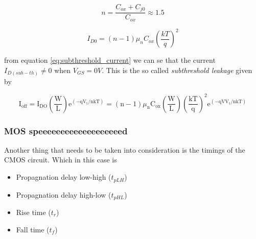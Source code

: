 \begin{equation}
    n=\frac{C_{ox}+C_{j0}}{C_{ox}}\approx 1.5
    \label{eq:n}
\end{equation}

\begin{equation}
    I_{D0}=(n-1)\mu_nC_{ox}\left(\frac{kT}{q}\right)^2
\end{equation}

from equation \ref{eq:subthreshold_current} we can se that the current $I_{D(sub-th)}\neq 0$ when $V_{GS}=0V$. This is the so called \textit{subthreshold leakage} given by 

\begin{equation}
    \mathrm{I}_{\mathrm{off}}=\mathrm{I}_{\mathrm{DO}}\left(\frac{\mathrm{W}}{\mathrm{L}}\right) \mathrm{e}^{\left(-\mathrm{q} \mathrm{V}_{\mathrm{t}} / \mathrm{nkT}\right)}=(\mathrm{n}-1) \mu_{\mathrm{n}} \mathrm{C}_{\mathrm{ox}}\left(\frac{\mathrm{W}}{\mathrm{L}}\right)\left(\frac{\mathrm{kT}}{\mathrm{q}}\right)^2 \mathrm{e}^{\left(-\mathrm{qV} \mathrm{V}_{\mathrm{t}} / \mathrm{nkT}\right)}
    \label{eq:subthreshold_leakage}
\end{equation}

\subsubsection{MOS speeeeeeeeeeeeeeeeeeed}
Another thing that needs to be taken into consideration is the timings of the CMOS circuit. Which in this case is 
\begin{itemize}
    \item Propagnation delay low-high ($t_{pLH}$)
    \subitem 
    \item Propagnation delay high-low ($t_{pHL}$)
    \item Rise time ($t_r$) 
    \item Fall time ($t_f$)
\end{itemize}